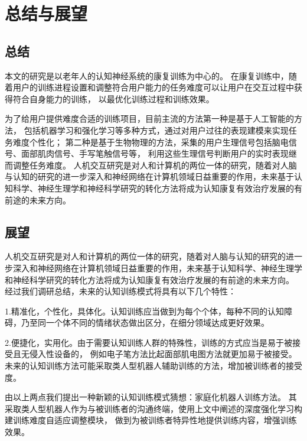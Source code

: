 \documentclass{article}
\begin{document}
    \section{总结与展望}
    \subsection{总结}
    本文的研究是以老年人的认知神经系统的康复训练为中心的。
    在康复训练中，随着用户的训练进程设置和调整符合用户能力的任务难度可以让用户在交互过程中获得符合自身能力的训练，
    以最优化训练过程和训练效果。
    
    为了给用户提供难度合适的训练项目，目前主流的方法第一种是基于人工智能的方法，
    包括机器学习和强化学习等多种方式，通过对用户过往的表现建模来实现任务难度个性化；
    第二种是基于生物物理的方法，采集的用户生理信号包括脑电信号、面部肌肉信号、手写笔触信号等，
    利用这些生理信号判断用户的实时表现继而调整任务难度。
    人机交互研究是对人和计算机的两位一体的研究，随着对人脑与认知的研究的进一步深入和神经网络在计算机领域日益重要的作用，未来基于认知科学、神经生理学和神经科学研究的转化方法将成为认知康复有效治疗发展的有前途的未来方向。



    \subsection{展望}
    人机交互研究是对人和计算机的两位一体的研究，随着对人脑与认知的研究的进一步深入和神经网络在计算机领域日益重要的作用，未来基于认知科学、神经生理学和神经科学研究的转化方法将成为认知康复有效治疗发展的有前途的未来方向。
    经过我们调研总结，未来的认知训练模式将具有以下几个特性：

    1.精准化，个性化，具体化。认知训练应当做到为每个个体，每种不同的认知障碍，乃至同一个体不同的情绪状态做出区分，在细分领域达成更好效果。

    2.便捷化，实用化。由于需要认知训练人群的特殊性，训练的方式应当是易于被接受且无侵入性设备的，
    例如电子笔方法比起面部肌电图方法就更加易于被接受。未来的认知训练方法可能采取类人型机器人辅助训练的方法，增加被训练者的接受度。

    由以上两点我们提出一种新颖的认知训练模式猜想：家庭化机器人训练方法。
    其采取类人型机器人作为与被训练者的沟通终端，使用上文中阐述的深度强化学习构建训练难度自适应调整模块，
    做到为被训练者特异性地提供训练内容，增强训练效果。
\end{document}
